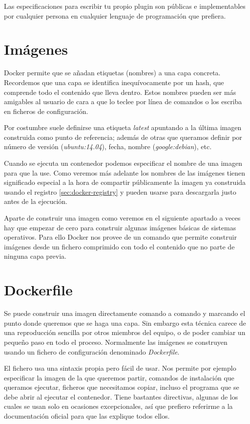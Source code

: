Las especificaciones para escribir tu propio plugin son públicas\cite{dockerwritevolumeplugin} e implementables por cualquier persona en cualquier lenguaje de programación que prefiera.

\section{Imágenes}
\label{sec:docker-images}

Docker permite que se añadan etiquetas (nombres) a una capa concreta. Recordemos que una capa se identifica inequívocamente por un hash, que comprende todo el contenido que lleva dentro. Estos nombres pueden ser más amigables al usuario de cara a que lo teclee por línea de comandos o los escriba en ficheros de configuración.

Por costumbre suele definirse una etiqueta \emph{latest} apuntando a la última imagen construida como punto de referencia; además de otras que queramos definir por número de versión (\emph{ubuntu:14.04}), fecha, nombre (\emph{google:debian}), etc.

Cuando se ejecuta un contenedor podemos especificar el nombre de una imagen para que la use. Como veremos más adelante los nombres de las imágenes tienen significado especial a la hora de compartir públicamente la imagen ya construida usando el registro \ref{sec:docker-registry} y pueden usarse para descargarla justo antes de la ejecución.

Aparte de construir una imagen como veremos en el siguiente apartado a veces hay que empezar de cero para construir algunas imágenes básicas de sistemas operativos. Para ello Docker nos provee de un comando\cite{dockerload} que permite construir imágenes desde un fichero comprimido con todo el contenido que no parte de ninguna capa previa.

\section{Dockerfile}
\label{sec:dockerfile}

Se puede construir una imagen directamente comando a comando y marcando el punto donde queremos que se haga una capa\cite{dockerimagecommit}. Sin embargo esta técnica carece de una reproducción sencilla por otros miembros del equipo, o de poder cambiar un pequeño paso en todo el proceso. Normalmente las imágenes se construyen usando un fichero de configuración denominado \emph{Dockerfile}.

El fichero usa una sintaxis propia\cite{dockerfile} pero fácil de usar. Nos permite por ejemplo especificar la imagen de la que queremos partir, comandos de instalación que queramos ejecutar, ficheros que necesitamos copiar, incluso el programa que se debe abrir al ejecutar el contenedor. Tiene bastantes directivas, algunas de los cuales se usan solo en ocasiones excepcionales, así que prefiero referirme a la documentación oficial para que las explique todos ellos.

